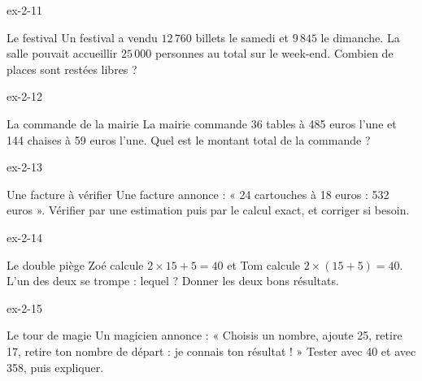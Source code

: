 \begin{blocLivre}{ex-2-11}\begin{exercice}[3]{Le festival}
Un festival a vendu $12\,760$ billets le samedi et $9\,845$ le dimanche. La salle pouvait accueillir $25\,000$ personnes au total sur le week-end. Combien de places sont restées libres ?
\end{exercice}\end{blocLivre}
\begin{blocLivre}{ex-2-12}\begin{exercice}[3]{La commande de la mairie}
La mairie commande 36 tables à 485 euros l’une et 144 chaises à 59 euros l’une. Quel est le montant total de la commande ?
\end{exercice}\end{blocLivre}
\begin{blocLivre}{ex-2-13}\begin{exercice}[3]{Une facture à vérifier}
Une facture annonce : « 24 cartouches à 18 euros : 532 euros ». Vérifier par une estimation puis par le calcul exact, et corriger si besoin.
\end{exercice}\end{blocLivre}
\begin{blocLivre}{ex-2-14}\begin{exercice}[3]{Le double piège}
Zoé calcule $2\times15+5=40$ et Tom calcule $2\times(15+5)=40$. L’un des deux se trompe : lequel ? Donner les deux bons résultats.
\end{exercice}\end{blocLivre}
\begin{blocLivre}{ex-2-15}\begin{exercice}[3]{Le tour de magie}
Un magicien annonce : « Choisis un nombre, ajoute 25, retire 17, retire ton nombre de départ : je connais ton résultat ! » Tester avec 40 et avec 358, puis expliquer.
\end{exercice}\end{blocLivre}

\clearpage
